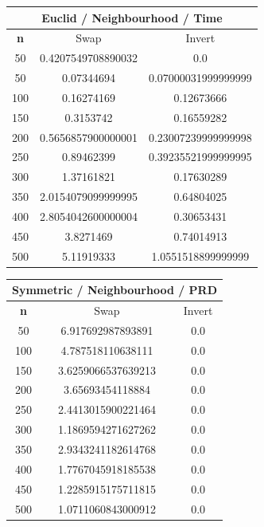 \documentclass{article}
\begin{document}
\begin{center}
\begin{tabular}{|c|c|c|}
\hline
\multicolumn{3}{|c|}{\textbf{Euclid / Neighbourhood / Time}}\\
\hline
\textbf{n} & Swap & Invert\\
\hline
50 & 0.4207549708890032 & 0.0\\
\hline
50 & 0.07344694 & 0.07000031999999999\\
\hline
100 & 0.16274169 & 0.12673666\\
\hline
150 & 0.3153742 & 0.16559282\\
\hline
200 & 0.5656857900000001 & 0.23007239999999998\\
\hline
250 & 0.89462399 & 0.39235521999999995\\
\hline
300 & 1.37161821 & 0.17630289\\
\hline
350 & 2.0154079099999995 & 0.64804025\\
\hline
400 & 2.8054042600000004 & 0.30653431\\
\hline
450 & 3.8271469 & 0.74014913\\
\hline
500 & 5.11919333 & 1.0551518899999999\\
\hline
\end{tabular}
\end{center}


\begin{center}
\begin{tabular}{|c|c|c|}
\hline
\multicolumn{3}{|c|}{\textbf{Symmetric / Neighbourhood / PRD}}\\
\hline
\textbf{n} & Swap & Invert\\
\hline
50 & 6.917692987893891 & 0.0\\
\hline
100 & 4.787518110638111 & 0.0\\
\hline
150 & 3.6259066537639213 & 0.0\\
\hline
200 & 3.65693454118884 & 0.0\\
\hline
250 & 2.4413015900221464 & 0.0\\
\hline
300 & 1.1869594271627262 & 0.0\\
\hline
350 & 2.9343241182614768 & 0.0\\
\hline
400 & 1.7767045918185538 & 0.0\\
\hline
450 & 1.2285915175711815 & 0.0\\
\hline
500 & 1.0711060843000912 & 0.0\\
\hline
\end{tabular}
\end{center}
\end{document}
